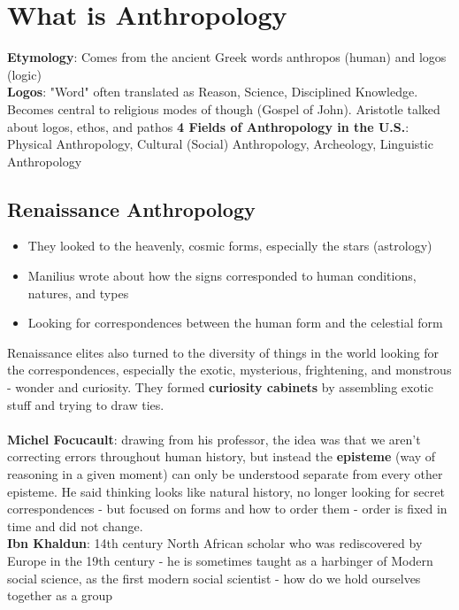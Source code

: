\documentclass{article}
\begin{document}
\tableofcontents

\newpage

\section{What is Anthropology}
\textbf{Etymology}: Comes from the ancient Greek words anthropos (human) and logos (logic) \\
\textbf{Logos}: "Word" often translated as Reason, Science, Disciplined Knowledge. Becomes central to religious modes of though (Gospel of John). Aristotle talked about logos, ethos, and pathos
\textbf{4 Fields of Anthropology in the U.S.}:  Physical Anthropology, Cultural (Social) Anthropology, Archeology, Linguistic Anthropology

\subsection{Renaissance Anthropology}
\begin{itemize}
\item They looked to the heavenly, cosmic forms, especially the stars (astrology)
\item Manilius wrote about how the signs corresponded to human conditions, natures, and types
\item Looking for correspondences between the human form and the celestial form
\end{itemize}
Renaissance elites also turned to the diversity of things in the world looking for the correspondences, especially the exotic, mysterious, frightening, and monstrous - wonder and curiosity. They formed \textbf{curiosity cabinets} by assembling exotic stuff and trying to draw ties. \\ \\
\textbf{Michel Focucault}: drawing from his professor, the idea was that we aren't correcting errors throughout human history, but instead the \textbf{episteme} (way of reasoning in a given moment) can only be understood separate from every other episteme. He said thinking looks like natural history, no longer looking for secret correspondences - but focused on forms and how to order them - order is fixed in time and did not change. \\
\textbf{Ibn Khaldun}: 14th century North African scholar who was rediscovered by Europe in the 19th century - he is sometimes taught as a harbinger of Modern social science, as the first modern social scientist - how do we hold ourselves together as a group
\end{document}
